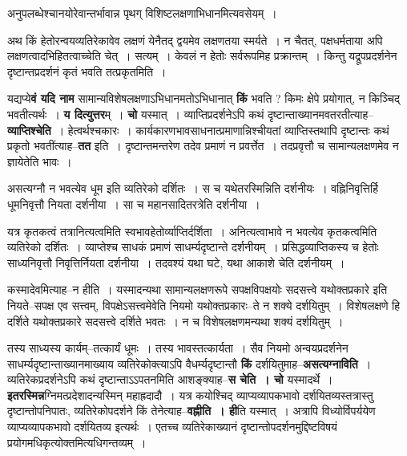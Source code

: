 \documentclass[article,12pt,a4paper]{memoir}
\begin{document}
	  \pstart अनुपलब्धेश्चानयोरेवान्तर्भावान्न पृथग् विशिष्टलक्षणाभिधानमित्यवसेयम् ।
	\pend
      

	  \pstart अथ किं हेतोरन्वयव्यतिरेकावेव लक्षणं येनैतद् द्वयमेव लक्षणतया स्मर्यते । न चैतत्, पक्षधर्मताया अपि लक्षणत्वादभिहितत्वाच्चेति चेत् । सत्यम् । केवलं न हेतोः सर्वरूपमिह प्रक्रान्तम् । किन्तु यद्रूपप्रदर्शनेन दृष्टान्तप्रदर्शनं कृतं भवति तत्प्रकृतमिति ।
	\pend
      

	  \pstart यद्यप्ये\textbf{वं यदि नाम} सामान्यविशेषलक्षणाऽभिधानमतोऽभिधानात् \textbf{किं} भवति ? किमः क्षेपे प्रयोगात्, न किञ्चिद् भवतीत्यर्थः । \textbf{य  दित्युत्तर}म् । \textbf{चो} यस्मात् । व्याप्तिप्रदर्शनेऽपि कथं दृष्टान्ताख्यानमवतरतीत्याह--\textbf{व्याप्तिश्चेति} । हेत्वर्थश्चकारः । कार्यकारणभावसाधनात्प्रमाणान्निश्चीयतां व्याप्तिस्तथापि दृष्टान्तः कथं प्रकृतो भवतींत्याह--\textbf{तत} इति । दृष्टान्तमन्तरेण तदेव प्रमाणं न प्रवर्त्तेत । तदप्रवृत्तौ च सामान्यलक्षणमेव न ज्ञायेतेति भावः ।  \leavevmode{} 
	  
	असत्यग्नौ न भवत्येव धूम इति व्यतिरेको दर्शितः । स च यथेतरस्मिन्निति दर्शनीयः । वह्निनिवृत्तिर्हि धूमनिवृत्तौ नियता दर्शनीया । सा च महानसादितरत्रेति दर्शनीया ।  
	  
	यत्र कृतकत्वं तत्रानित्यत्वमिति स्वभावहेतोर्व्याप्तिर्दर्शिता । अनित्यत्वाभावे न भवत्येव कृतकत्वमिति व्यतिरेको दर्शितः । व्याप्तेश्च साधकं प्रमाणं साधर्म्यदृष्टान्ते दर्शनीयम् । प्रसिद्धव्याप्तिकस्य च हेतोः साध्यनिवृत्तौ निवृत्तिर्नियता दर्शनीया । तदवश्यं यथा घटे, यथा आकाशे चेति दर्शनीयम् ।  
	  
	कस्मादेवमित्याह--न हीति । यस्मादन्यथा सामान्यलक्षणरूपे सपक्षविपक्षयोः सदसत्त्वे यथोक्तप्रकारे इति नियते--सपक्ष एव सत्त्वम्, विपक्षेऽसत्त्वमेवेति नियमो यथोक्तप्रकारः--ते न शक्ये दर्शयितुम् । विशेषलक्षणे हि दर्शिते यथोक्तप्रकारे सदसत्त्वे दर्शिते भवतः । न च विशेषलक्षणमन्यथा शक्यं दर्शयितुम् ।  
	  
	तस्य साध्यस्य कार्यम्--तत्कार्यं धूमः । तस्य भावस्तत्कार्यता । सैव नियमो अन्वयप्रदर्शनेन साधर्म्यदृष्टान्ताख्यानमाख्याय व्यतिरेकोक्त्याऽपि वैधर्म्यदृष्टान्तौ \textbf{किं}  दर्शयितुमाह--\textbf{असत्यग्नाविति} । व्यतिरेकप्रदर्शनेऽपि कथं दृष्टान्ताऽऽपतनमिति आशङ्क्याह--\textbf{स चेति । चो} यस्मादर्थे । \textbf{इतरस्मिन्न}ग्निमत्प्रदेशादन्यस्मिन् महाह्रदादौ । यत्र कयोश्चिद् व्याप्यव्यापकभावो दर्शयितव्यस्तत्रास्तु दृष्टान्तोपनिपातः, व्यतिरेकोपदर्शने किं तेनेत्याह--\textbf{वह्नीति । ही}ति यस्मात् । अत्रापि विध्योर्विपर्ययेण व्याप्यव्यापकभावो दर्शयितव्य इत्यर्थः । एतच्च व्यतिरेकाख्यानं दृष्टान्तोपदर्शनमुद्दिष्टविषयं प्रयोगमधिकृत्योक्तमित्यधिगन्तव्यम् ।
	\pend
      
\end{document}
